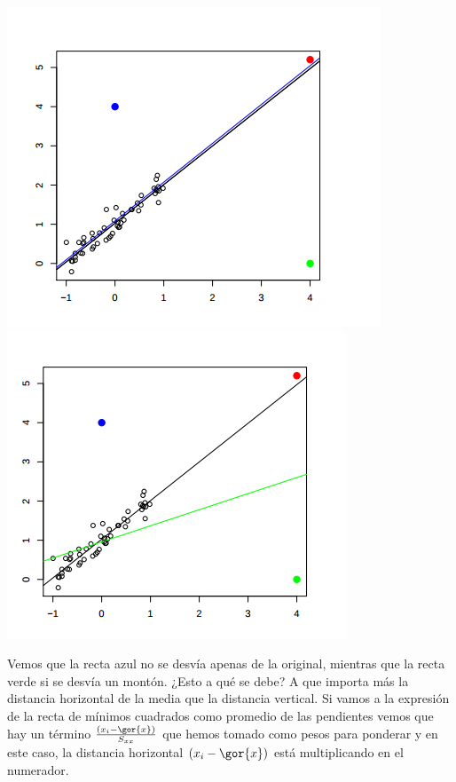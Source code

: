 \documentclass[palatino,nochap]{apuntes}
\begin{document}
\begin{example}
\begin{center}
\includegraphics[scale=0.4]{img/sobredistanciahorizontal1.png}
\includegraphics[scale=0.4]{img/sobredistanciahorizontal2.png}
\end{center}

Vemos que la recta azul no se desvía apenas de la original, mientras que la recta verde si se desvía un montón. ¿Esto a qué se debe? A que importa más la distancia horizontal de la media que la distancia vertical. Si vamos a la expresión de la recta de mínimos cuadrados como promedio de las pendientes \label{rmc::promediopendientes} vemos que hay un término $\frac{(x_i - \gor{x})}{S_{xx}}$ que hemos tomado como pesos para ponderar y en este caso, la distancia horizontal $(x_i - \gor{x})$ está multiplicando en el numerador.



\end{example}
\end{document}
